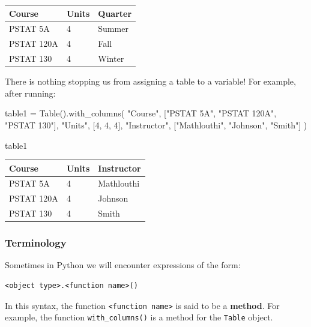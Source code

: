 \documentclass[
  11pt,
]{article}
\newenvironment{Shaded}{\begin{snugshade}}{\end{snugshade}}
\newcommand{\DecValTok}[1]{\textcolor[rgb]{0.68,0.00,0.00}{#1}}
\newcommand{\NormalTok}[1]{\textcolor[rgb]{0.00,0.23,0.31}{#1}}
\newcommand{\OperatorTok}[1]{\textcolor[rgb]{0.37,0.37,0.37}{#1}}
\newcommand{\StringTok}[1]{\textcolor[rgb]{0.13,0.47,0.30}{#1}}
\begin{document}
\begin{longtable}[]{@{}lll@{}}
\toprule\noalign{}
Course & Units & Quarter \\
\midrule\noalign{}
\endhead
\bottomrule\noalign{}
\endlastfoot
PSTAT 5A & 4 & Summer \\
PSTAT 120A & 4 & Fall \\
PSTAT 130 & 4 & Winter \\
\end{longtable}

There is nothing stopping us from assigning a table to a variable! For
example, after running:

\begin{Shaded}
\begin{Highlighting}[]
\NormalTok{table1 }\OperatorTok{=}\NormalTok{ Table().with\_columns(}
  \StringTok{"Course"}\NormalTok{, [}\StringTok{"PSTAT 5A"}\NormalTok{, }\StringTok{"PSTAT 120A"}\NormalTok{, }\StringTok{"PSTAT 130"}\NormalTok{],}
  \StringTok{"Units"}\NormalTok{, [}\DecValTok{4}\NormalTok{, }\DecValTok{4}\NormalTok{, }\DecValTok{4}\NormalTok{],}
  \StringTok{"Instructor"}\NormalTok{, [}\StringTok{"Mathlouthi"}\NormalTok{, }\StringTok{"Johnson"}\NormalTok{, }\StringTok{"Smith"}\NormalTok{]}
\NormalTok{)}

\NormalTok{table1}
\end{Highlighting}
\end{Shaded}

\begin{longtable}[]{@{}lll@{}}
\toprule\noalign{}
Course & Units & Instructor \\
\midrule\noalign{}
\endhead
\bottomrule\noalign{}
\endlastfoot
PSTAT 5A & 4 & Mathlouthi \\
PSTAT 120A & 4 & Johnson \\
PSTAT 130 & 4 & Smith \\
\end{longtable}

\subsubsection{Terminology}\label{terminology}

Sometimes in Python we will encounter expressions of the form:

\begin{verbatim}
<object type>.<function name>()
\end{verbatim}

In this syntax, the function
\texttt{\textless{}function\ name\textgreater{}} is said to be a
\textbf{method}. For example, the function \texttt{with\_columns()} is a
method for the \texttt{Table} object.
\end{document}
